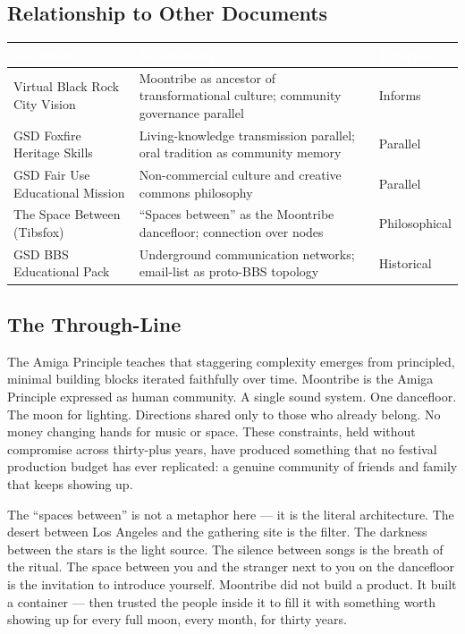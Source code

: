 \documentclass[11pt,letterpaper]{article}
\newcommand{\tableheader}[1]{\textbf{\sffamily\textcolor{white}{#1}}}
\begin{document}
\subsection{Relationship to Other Documents}

\begin{center}
\begin{tabularx}{\textwidth}{L{4cm}XC{2.5cm}}
\toprule
{}
\tableheader{Document} & \tableheader{Relationship} & \tableheader{Direction} \\
\midrule
Virtual Black Rock City Vision & Moontribe as ancestor of transformational culture; community governance parallel & Informs \\
GSD Foxfire Heritage Skills & Living-knowledge transmission parallel; oral tradition as community memory & Parallel \\
GSD Fair Use Educational Mission & Non-commercial culture and creative commons philosophy & Parallel \\
The Space Between (Tibsfox) & ``Spaces between'' as the Moontribe dancefloor; connection over nodes & Philosophical \\
GSD BBS Educational Pack & Underground communication networks; email-list as proto-BBS topology & Historical \\
\bottomrule
\end{tabularx}
\end{center}

\subsection{The Through-Line}

The Amiga Principle teaches that staggering complexity emerges from principled, minimal building blocks iterated faithfully over time. Moontribe is the Amiga Principle expressed as human community. A single sound system. One dancefloor. The moon for lighting. Directions shared only to those who already belong. No money changing hands for music or space. These constraints, held without compromise across thirty-plus years, have produced something that no festival production budget has ever replicated: a genuine community of friends and family that keeps showing up.

The ``spaces between'' is not a metaphor here --- it is the literal architecture. The desert between Los Angeles and the gathering site is the filter. The darkness between the stars is the light source. The silence between songs is the breath of the ritual. The space between you and the stranger next to you on the dancefloor is the invitation to introduce yourself. Moontribe did not build a product. It built a container --- then trusted the people inside it to fill it with something worth showing up for every full moon, every month, for thirty years.
\end{document}
